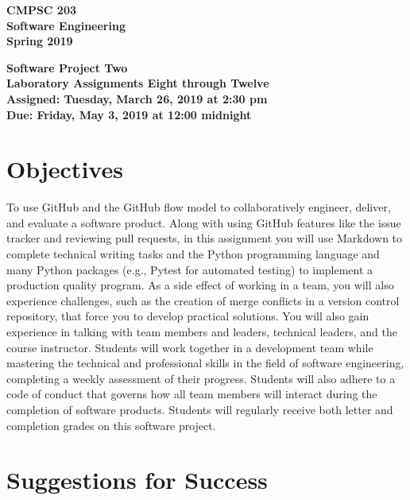 \documentclass[11pt]{article}
\newcommand{\assignmentduedate}{May 3}
\newcommand{\assignmentassignedate}{March 26}
\newcommand{\assignmentnumber}{Two}
\newcommand{\labassignmentnumberstart}{Eight}
\newcommand{\labassignmentnumberend}{Twelve}
\newcommand{\labyear}{2019}
\newcommand{\labdueday}{Friday}
\newcommand{\labassignday}{Tuesday}
\newcommand{\labtime}{2:30 pm}
\newcommand{\labduetime}{12:00 midnight}
\newcommand{\assigneddate}{Assigned: \labassignday, \assignmentassignedate, \labyear{} at \labtime{}}
\newcommand{\duedate}{Due: \labdueday, \assignmentduedate, \labyear{} at \labduetime{}}
\newcommand{\labtitle}[1]
{
  \begin{center}
    \begin{center}
      \bf
      CMPSC 203\\Software Engineering\\
      Spring 2019\\
      \medskip
    \end{center}
    \bf
    #1
  \end{center}
}
\begin{document}
\thispagestyle{empty}

\labtitle{Software Project \assignmentnumber{} \\ Laboratory Assignments \labassignmentnumberstart{} through \labassignmentnumberend{} \\ \assigneddate{} \\ \duedate{}}

\section*{Objectives}

To use GitHub and the GitHub flow model to collaboratively engineer, deliver,
and evaluate a software product.
%
Along with using GitHub features like the issue tracker and reviewing pull
requests, in this assignment you will use Markdown to complete technical writing
tasks and the Python programming language and many Python packages (e.g., Pytest
for automated testing) to implement a production quality program.
%
As a side effect of working in a team, you will also experience challenges, such
as the creation of merge conflicts in a version control repository, that force
you to develop practical solutions.
%
You will also gain experience in talking with team members and leaders,
technical leaders, and the course instructor.
%
Students will work together in a development team while mastering the technical
and professional skills in the field of software engineering, completing a
weekly assessment of their progress.
%
Students will also adhere to a code of conduct that governs how all team members
will interact during the completion of software products.
%
Students will regularly receive both letter and completion grades on this
software project.

\section*{Suggestions for Success}
\end{document}
